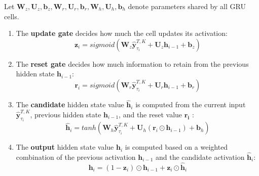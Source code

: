 \documentclass[letterpaper,12pt,titlepage,oneside,final]{book}
\numberwithin{equation}{section}
\theoremstyle{definition}
\newcommand{\vb}{\mathbf{b}}
\newcommand{\vy}{\mathbf{y}}
\newcommand{\vh}{\mathbf{h}}
\newcommand{\vW}{\pmb{W}}
\newcommand{\vU}{\pmb{U}}
\begin{document}
Let  $\vW_z,\vU_z,\vb_z,\vW_r,\vU_r, \vb_r,\vW_h,\vU_h,\vb_h$  denote
parameters shared by all GRU cells.


\begin{enumerate}
	\item The \textbf{update gate} decides how much the cell updates its activation:
	\[\mathbf{z}_i= sigmoid ( \vW_z \widehat{\vy}^{T,K}_{\tau_{i}} + \vU_z \vh_{i-1} +\vb_z)\]
	\item The \textbf{reset gate} decides how much  information to retain from the  previous hidden state $\vh_{i-1}$:
	\[\mathbf{r}_i= sigmoid ( \vW_r \widehat{\vy}^{T,K}_{\tau_{i}} + \vU_r \vh_{i-1} +\vb_r)\]
	\item The \textbf{candidate} hidden state value $\widehat{\vh}_i$ is computed from the current input $\widehat{\vy}^{T,K}_{\tau_{i}}$,  previous hidden state $\vh_{i-1}$, and the reset value $\mathbf{r_i}$ :
	\[
	\widehat{\vh}_i=tanh( \vW_h \widehat{\vy}^{T,K}_{\tau_{i}}  + \vU_h (\mathbf{r}_i \odot \vh_{i-1}) +\vb_h)
	\]
	\item  The \textbf{output} hidden state value $\vh_{i}$ is  computed based on a weighted combination of the previous activation $\vh_{i-1}$ and the candidate activation $\widehat{\vh}_i$:
	\[
	\vh_i=(1-\mathbf{z}_i) \odot \vh_{i-1} + \mathbf{z}_i \odot \widehat{\vh}_i
	\]
\end{enumerate}
\end{document}
